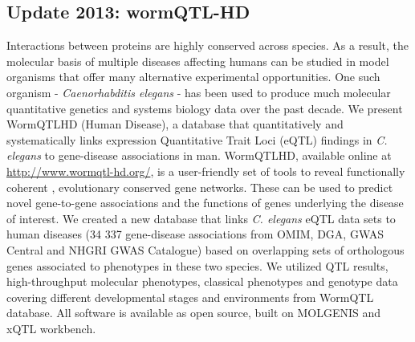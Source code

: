 \subsection{Update 2013: wormQTL-HD}
Interactions between proteins are highly conserved across species. As a result, the molecular basis 
of multiple diseases affecting humans can be studied in model organisms that offer many alternative 
experimental opportunities. One such organism - \emph{Caenorhabditis elegans} - has been used to produce much 
molecular quantitative genetics and systems biology data over the past decade. We present WormQTLHD 
(Human Disease), a database that quantitatively and systematically links expression Quantitative 
Trait Loci (eQTL) findings in \emph{C. elegans} to gene-disease associations in man. WormQTLHD, available 
online at \url{http://www.wormqtl-hd.org/}, is a user-friendly set of tools to reveal functionally coherent
, evolutionary conserved gene networks. These can be used to predict novel gene-to-gene associations 
and the functions of genes underlying the disease of interest. We created a new database that links 
\emph{C. elegans} eQTL data sets to human diseases (34 337 gene-disease associations from OMIM, DGA, GWAS 
Central and NHGRI GWAS Catalogue) based on overlapping sets of orthologous genes associated to 
phenotypes in these two species. We utilized QTL results, high-throughput molecular phenotypes, 
classical phenotypes and genotype data covering different developmental stages and environments from 
WormQTL database. All software is available as open source, built on MOLGENIS and xQTL workbench. 


